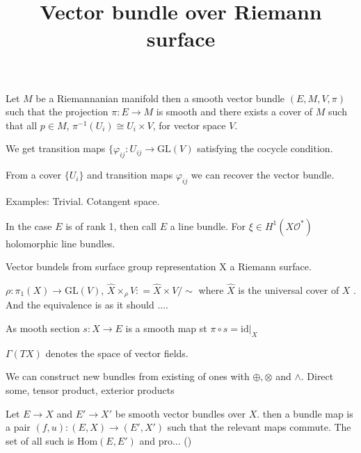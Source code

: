 % 

\title{Vector bundle over Riemann surface}
\author{}
\date{}

 
\maketitle

\begin{definition}
    Let $M$ be a Riemannanian manifold 
    then a smooth vector bundle $(E, M, V, \pi) $ such that the projection 
    $ \pi : E \rightarrow  M $ is smooth and 
    there exists a cover of $M$ such that all $ p \in M $, $ \pi^{-1} (U_i) \cong U_i \times V $, for vector space $V$. 
\end{definition}

We get transition maps $ \{ \varphi_{ij} : U_{ij} \rightarrow  \mathrm{GL} ( V) $ satisfying the cocycle condition.

From a cover $\{U_i \} $ and transition maps $ \varphi _{ij} $ we can recover the vector bundle. 

Examples: 
Trivial. 
Cotangent space. 

In the case $ E$ is of rank 1, then call $E$ a line bundle. 
For $ \xi \in H^1( X \mathcal{O} ^* ) $ holomorphic line bundles. 

Vector bundels from surface group representation 
X a Riemann surface. 

$\rho : \pi_1 ( X) \rightarrow  \mathrm{GL} (V) $, 
$ \hat{X} \times _\rho V : = \hat{X} \times V / \sim $
where $ \hat{X} $ is the universal cover of $ X $ .
And the equivalence is as it should ....


\begin{definition}
 As mooth section $ s: X \rightarrow  E $ is a smooth map st $ \pi \circ s  = \mathrm{id} | _ X $ 
\end{definition}

$\Gamma ( TX) $ denotes the space of vector fields.

We can construct new bundles from existing of ones with $ \oplus, \otimes$ and $ \wedge $. 
Direct some, tensor product, exterior products 

\begin{definition}
    Let $E \rightarrow X $ and $ E' \rightarrow  X' $ be smooth vector bundles over $ X$. 
    then a bundle map is a pair $(f,u) : (E,X) \rightarrow  ( E', X') $ such that the relevant maps commute. 
    The set of all such is $\mathrm{Hom}(E, E') $ and pro... () 
\end{definition}

